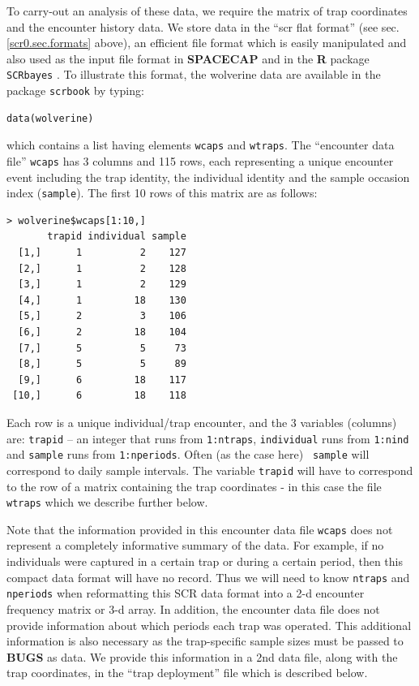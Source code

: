 To carry-out an analysis of these data, we require the matrix of trap
coordinates and the encounter history data.  We store data in the
``scr flat format'' (see sec.  \ref{scr0.sec.formats} above), an
efficient file format which is easily manipulated and also used as the
input file format in {\bf SPACECAP} \citep{gopalaswamy_etal:2012} and
in the {\bf R} package \mbox{\tt SCRbayes} \citep{russell_etal:2012}.
To illustrate this format, the wolverine data are available in the
package \mbox{\tt scrbook} by typing:
\begin{verbatim}
data(wolverine)
\end{verbatim}
which contains a list having elements \mbox{\tt wcaps} and
\mbox{\tt wtraps}.
The ``encounter data file''
\mbox{\tt wcaps}  has 3 columns and 115 rows, each representing a
unique encounter event including the trap identity, the individual
identity and the sample occasion index (\mbox{\tt sample}).
The first 10 rows of this matrix are as
follows:
{\small
\begin{verbatim}
> wolverine$wcaps[1:10,]
       trapid individual sample
  [1,]      1          2    127
  [2,]      1          2    128
  [3,]      1          2    129
  [4,]      1         18    130
  [5,]      2          3    106
  [6,]      2         18    104
  [7,]      5          5     73
  [8,]      5          5     89
  [9,]      6         18    117
 [10,]      6         18    118
\end{verbatim}
}
Each row is a unique 
individual/trap encounter, and the 3 variables (columns) are: 
\mbox{\tt trapid} -- an
integer that runs from \mbox{\tt 1:ntraps}, \mbox{\tt individual} runs from
\mbox{\tt 1:nind} and
\mbox{\tt sample} 
runs from \mbox{\tt 1:nperiods}. Often (as the case here) \mbox{\tt
  sample} 
will
correspond to daily sample intervals. The variable \mbox{\tt trapid} will have to
correspond to the row of a matrix containing the trap coordinates - in
this case the file \mbox{\tt wtraps} which we describe further below.

Note that the information provided in this encounter data file
\mbox{\tt wcaps} does not represent a completely informative summary
of the data. For example, if no individuals were captured in a certain
trap or during a certain period, then this compact data format will
have no record. Thus we will need to know \mbox{\tt ntraps} and
\mbox{\tt nperiods} when reformatting this SCR data format into a 2-d
encounter frequency matrix or 3-d array. In addition, the encounter
data file does not provide information about which periods each trap
was operated. This additional information is also necessary as the
trap-specific sample sizes must be passed to {\bf BUGS} as data. We
provide this information in a 2nd data file, along with the trap
coordinates, in the ``trap deployment'' file which is described below.

